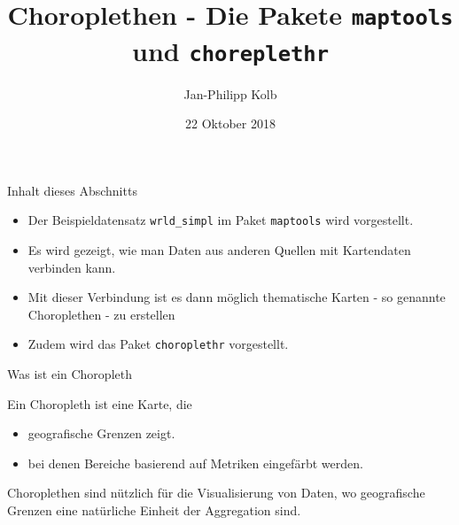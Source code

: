\documentclass[ignorenonframetext,]{beamer}
\title{Choroplethen - Die Pakete \texttt{maptools} und \texttt{choreplethr}}
\author{Jan-Philipp Kolb}
\date{22 Oktober 2018}
\providecommand{\tightlist}{%
  \setlength{\itemsep}{0pt}\setlength{\parskip}{0pt}}
\begin{document}
\frame{\titlepage}

\begin{frame}[fragile]{Inhalt dieses Abschnitts}
\protect\hypertarget{inhalt-dieses-abschnitts}{}

\begin{itemize}
\tightlist
\item
  Der Beispieldatensatz \texttt{wrld\_simpl} im Paket \texttt{maptools}
  wird vorgestellt.
\item
  Es wird gezeigt, wie man Daten aus anderen Quellen mit Kartendaten
  verbinden kann.
\item
  Mit dieser Verbindung ist es dann möglich thematische Karten - so
  genannte Choroplethen - zu erstellen
\item
  Zudem wird das Paket \texttt{choroplethr} vorgestellt.
\end{itemize}

\end{frame}

\begin{frame}{Was ist ein Choropleth}
\protect\hypertarget{was-ist-ein-choropleth}{}

Ein Choropleth ist eine Karte, die

\begin{itemize}
\tightlist
\item
  geografische Grenzen zeigt.
\item
  bei denen Bereiche basierend auf Metriken eingefärbt werden.
\end{itemize}

Choroplethen sind nützlich für die Visualisierung von Daten, wo
geografische Grenzen eine natürliche Einheit der Aggregation sind.

\end{frame}
\end{document}
